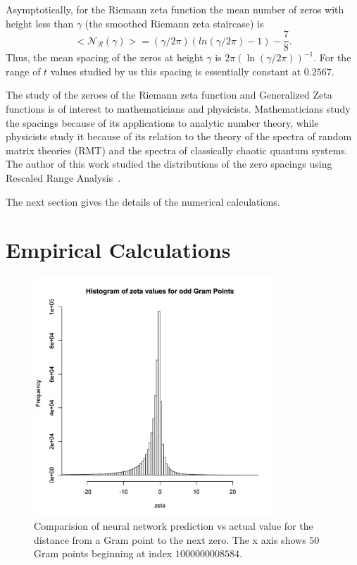 \documentclass[12pt]{article}
\begin{document}
Asymptotically, for the Riemann zeta function the mean number of 
zeros with height less than $\gamma$ (the smoothed Riemann zeta staircase)
is~\cite{Edwards(1974)}
\begin{equation}  
<\mathcal{N_R} (\gamma)> = (\gamma/2\pi)(ln(\gamma/2\pi)-1)-\frac{7}{8}.
\label{eq:Rnumber}
\end{equation}
Thus, the mean spacing of the zeros at height $\gamma$ is 
$2\pi(\ln (\gamma/2\pi))^{-1}$. For the range of $t$ values
studied by us this spacing is essentially constant at $0.2567$.

The study of the zeroes of the Riemann zeta function and Generalized 
Zeta functions is of interest to mathematicians and physicists. Mathematicians 
study the spacings because of its applications to analytic number theory, 
while physicists study it because of its  relation 
to the theory of the spectra of random matrix theories (RMT) 
and the spectra of classically chaotic quantum systems. 
The author of this work studied the distributions of the zero 
spacings using Rescaled Range Analysis~\cite{os6}.


The next section gives the details of the numerical calculations.

\section{\label{sec3}Empirical Calculations}


\begin{figure}
\centering
\includegraphics[width=0.8\textwidth]{ozeta.jpg}
\caption[]{ 
 Comparision of neural network prediction vs actual value
 for the distance from a Gram point to the next zero.
 The x axis shows $50$ Gram points beginning at index $1000000008584$.
 }
\label{NextZero}
\end{figure}
\end{document}
